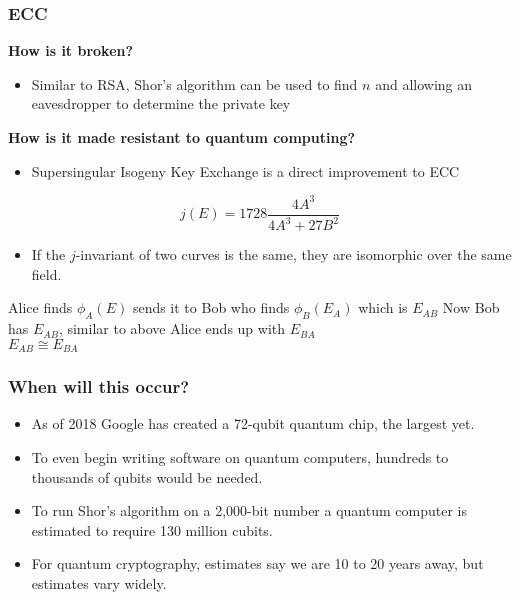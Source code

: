 \documentclass{beamer}
\begin{document}
\begin{frame}
\frametitle{ECC}
{\bf How is it broken?}\\
\begin{itemize}
    \pause
    \item Similar to RSA, Shor's algorithm can be used to find $n$ and allowing an eavesdropper to determine the private key
    \pause
\end{itemize}
\vspace{0.1in}
{\bf How is it made resistant to quantum computing?}\\
\begin{itemize}
    \pause
    \item  Supersingular  Isogeny  Key  Exchange  is a direct  improvement to ECC
\end{itemize}
\pause
$$j(E)=1728\frac{4A^3}{4A^3+27B^2}$$
\begin{itemize}
\pause
    \item If the $j$-invariant of two curves is the same, they are isomorphic over the same field.
\end{itemize}
\pause
\begin{center}
 Alice finds $\phi_A(E)$ sends it to Bob who finds  $\phi_B(E_A)$ which is $E_{AB}$
 Now Bob has $E_{AB}$, similar to above Alice ends up with $E_{BA}$\\
 $E_{AB}\cong E_{BA}$
\end{center}
\end{frame}

\begin{frame}
\frametitle{When will this occur?}
\begin{itemize}
\pause
\item As of 2018 Google has created a 72-qubit quantum chip, the largest yet.
\pause
\item To even begin writing software on quantum computers, hundreds to thousands of qubits would be needed. 
\pause
\item To run Shor's algorithm on a 2,000-bit number a quantum computer is estimated to require 130 million cubits.
\pause
\item For quantum cryptography, estimates say we are 10 to 20 years away, but estimates vary widely.
\end{itemize}
\end{frame}
\end{document}

